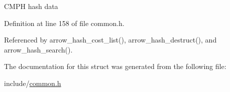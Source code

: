 CMPH hash data 

Definition at line 158 of file common.h.

Referenced by arrow\_\-hash\_\-cost\_\-list(), arrow\_\-hash\_\-destruct(), and arrow\_\-hash\_\-search().

The documentation for this struct was generated from the following file:\begin{CompactItemize}
\item 
include/\hyperlink{common_8h}{common.h}\end{CompactItemize}
